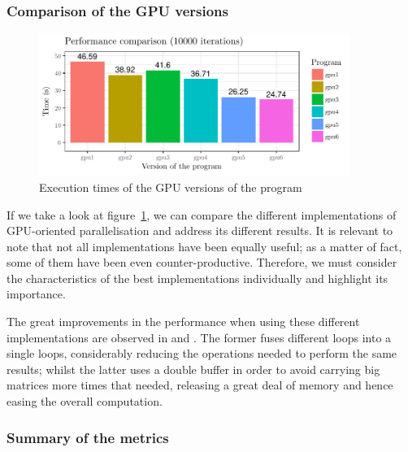 \subsubsection{Comparison of the GPU versions}
\begin{figure}[H]
	\centering
	\includegraphics[width=0.9\textwidth]{images/times-gpu}
	\caption{Execution times of the GPU versions of the program}
	\label{fig:times-gpu}
\end{figure}

If we take a look at figure~\ref{fig:times-gpu}, we can compare the different implementations of GPU-oriented parallelisation and address its different results. It is relevant to note that not all implementations have been equally useful; as a matter of fact, some of them have been even counter-productive. Therefore, we  must consider the characteristics of the best implementations individually and highlight its importance.

The great improvements in the performance when using these different implementations are observed  in  and . The former fuses different loops into a single loops, considerably reducing the operations needed to perform the same results; whilst the latter uses a double buffer in order to avoid carrying big matrices more times that needed, releasing a great deal of memory and hence easing the overall computation.

\subsubsection{Summary of the metrics}

